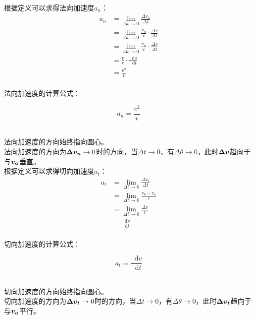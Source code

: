 \documentclass[UTF8]{ctexart}
\newcommand*{\veb}[1]{\vb*{#1}}
\newcommand*{\dif}{\mathop{}\!\mathrm{d}}
\begin{document}
    根据定义可以求得法向加速度$a_n$：
    \begin{align}
        a_n
        &=\lim_{\Delta t\rightarrow 0}\frac{\Delta v_n}{\Delta t}\\[3mm]
        &=\lim_{\Delta t\rightarrow 0}\frac{v_n}{r}\cdot\frac{\Delta r}{\Delta t}\\[3mm]
        &=\lim_{\Delta t\rightarrow 0}\frac{v_n}{r}\cdot\frac{\Delta s}{\Delta t}\\[3mm]
        &=\frac{v}{r}\cdot\frac{\dif s}{\dif t}\\[3mm]
        &=\frac{v^2}{r}
    \end{align}\\
    法向加速度的计算公式：
    \begin{large}
        \begin{equation*}
            a_n=\frac{v^2}{r}
        \end{equation*}
    \end{large}\\
    法向加速度的方向始终指向圆心。\\[3mm]
    法向加速度的方向为$\veb{\Delta v_n}\rightarrow 0$时的方向，当$\Delta t\rightarrow 0$，有$\Delta\theta\rightarrow 0$，此时$\veb{\Delta v}$趋向于与$\veb{v_a}$垂直。\\[12mm]
    根据定义可以求得切向加速度$a_t$：
    \begin{align}
        a_t
        &=\lim_{\Delta t\rightarrow 0}\frac{\Delta v_t}{\Delta t}\\[3mm]
        &=\lim_{\Delta t\rightarrow 0}\frac{v_b-v_a}{r}\\[3mm]
        &=\lim_{\Delta t\rightarrow 0}\frac{\Delta v}{r}\\[3mm]
        &=\frac{\dif v}{\dif t}
    \end{align}\\
    切向加速度的计算公式：
    \begin{large}
        \begin{equation*}
            a_t=\frac{\dif v}{\dif t}
        \end{equation*}
    \end{large}\\
    切向加速度的方向始终指向圆心。\\[3mm]
    切向加速度的方向为$\veb{\Delta v_t}\rightarrow 0$时的方向，当$\Delta t\rightarrow 0$，有$\Delta\theta\rightarrow 0$，此时$\veb{\Delta v_t}$趋向于与$\veb{v_a}$平行。

\newpage
\end{document}
